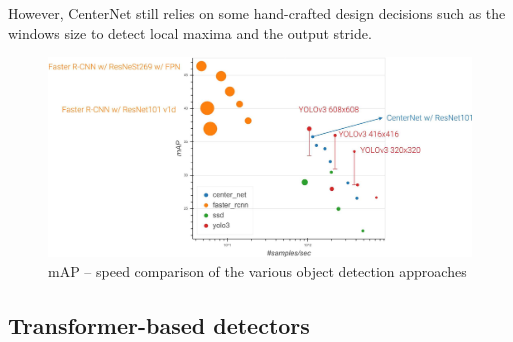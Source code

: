 \begin{description}
\begin{remark}
        However, CenterNet still relies on some hand-crafted design decisions such as the windows size to detect local maxima and the output stride.
    \end{remark}
\end{description}

\begin{figure}[H]
    \centering
    \includegraphics[width=0.55\linewidth]{./img/_object_detection_map_speed_plot.jpg}
    \caption{
        mAP -- speed comparison of the various object detection approaches
    }
\end{figure}


\subsection{Transformer-based detectors}

